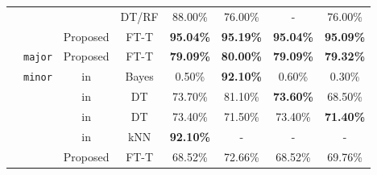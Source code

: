 \begin{table}[h!]
\begin{tabular}{cccccccc}
                       &                         & {\cellcolor{my_grey}}\cite{hulak_evaluation_2023}           & {\cellcolor{my_grey}}DT/RF          & {\cellcolor{my_grey}}88.00\%           & {\cellcolor{my_grey}}76.00\%            & {\cellcolor{my_grey}}-               & {\cellcolor{my_grey}}76.00\%           \\
\hhline{~~------}
                       &                         & Proposed        & FT-T           & {\cellcolor{my_blue}}\textbf{95.04\%}           & {\cellcolor{my_blue}}\textbf{95.19\%}            & {\cellcolor{my_blue}}\textbf{95.04\%}         & {\cellcolor{my_blue}}\textbf{95.09\%}           \\ 
                       \hhline{~-------}
                       & \texttt{major}                   & {\cellcolor{my_grey}}Proposed        & {\cellcolor{my_grey}}FT-T           & {\cellcolor{my_blue}}\textbf{79.09\%}           & {\cellcolor{my_blue}}\textbf{80.00\%}            & {\cellcolor{my_blue}}\textbf{79.09\%}         & {\cellcolor{my_blue}}\textbf{79.32\%}           \\ 
                       \hhline{~-------}
                       & \multirow{5}{*}{\texttt{minor}}  & \cite{beverly_robust_2004} in \cite{lastovicka_passive_2023}         & Bayes          & 0.50\%            & {\cellcolor{my_blue}}\textbf{92.10\%}            & 0.60\%          & 0.30\%            \\ 
                       &                         & {\cellcolor{my_grey}}\cite{lastovicka_cybersecurity_2018} in \cite{lastovicka_passive_2023}   & {\cellcolor{my_grey}}DT             & {\cellcolor{my_grey}}73.70\%           & {\cellcolor{my_grey}}81.10\%            & {\cellcolor{my_blue}}\textbf{73.60\%}         & {\cellcolor{my_grey}}68.50\%           \\
                       &                         & \cite{lastovicka_usingTLS_2020} in \cite{lastovicka_passive_2023}   & DT             & 73.40\%           & 71.50\%            & 73.40\%         & {\cellcolor{my_blue}}\textbf{71.40\%}           \\
                       &                         & {\cellcolor{my_grey}}\cite{lippmann_passive_2003} in \cite{lastovicka_passive_2023}       & {\cellcolor{my_grey}}kNN            & {\cellcolor{my_blue}}\textbf{92.10\%}           & {\cellcolor{my_grey}}-                  & {\cellcolor{my_grey}}-               & {\cellcolor{my_grey}}-                 \\
\hhline{~~------}
                       &                         & Proposed        & FT-T           & 68.52\%           & 72.66\%            & 68.52\%         & 69.76\%           \\ \hline \hline

\end{tabular}
\end{table}
